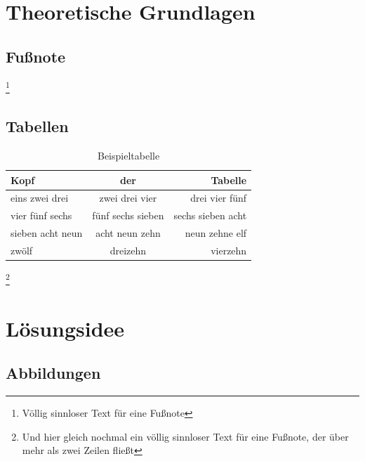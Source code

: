 \chapter{Theoretische Grundlagen}
\section{Fußnote}
\blindtext\footnote{Völlig sinnloser Text für eine Fußnote}

\blindtext
\section{Tabellen}

\begin{table}[ht]
 \caption{Beispieltabelle}
 \label{tab:beispiel}
 \centering
 \begin{tabular}{lcr}\toprule
   Kopf & der & Tabelle \\\midrule
   eins zwei drei & zwei drei vier & drei vier fünf \\ 
   vier fünf sechs& fünf sechs sieben& sechs sieben acht\\
   sieben acht neun& acht neun zehn & neun zehne elf \\
   zwölf & dreizehn & vierzehn \\\bottomrule
 \end{tabular}
\end{table}

\blindtext\footnote{Und hier gleich nochmal ein völlig sinnloser Text für eine Fußnote, der über mehr als zwei Zeilen fließt}

\chapter{Lösungsidee}
\section{Abbildungen}
\blindtext

